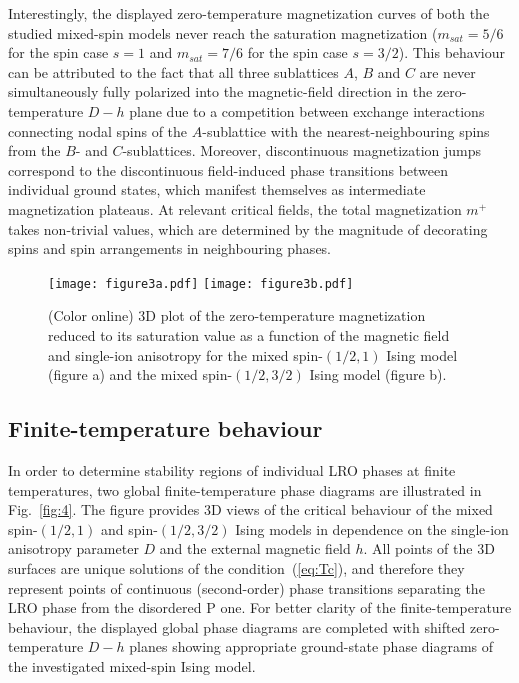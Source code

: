 \documentclass[final,5p,times,sort&compress]{elsarticle}
\begin{document}
Interestingly, the displayed zero-temperature magnetization curves of both the studied mixed-spin models never reach the saturation magnetization ($m_{sat} = 5/6$ for the spin case $s=1$ and $m_{sat} = 7/6$ for the spin case $s=3/2$). This behaviour can be attributed to the fact that all three sublattices $A$, $B$ and $C$ are never simultaneously fully polarized into the magnetic-field direction in the zero-temperature $D-h$ plane due to a competition between exchange interactions connecting nodal spins of the $A$-sublattice with the nearest-neighbouring spins from the $B$- and $C$-sublattices. Moreover, discontinuous magnetization jumps correspond to the discontinuous field-induced phase transitions between individual ground states, which manifest themselves as intermediate magnetization plateaus. At relevant critical fields, the total magnetization $m^+$ takes non-trivial values, which are determined by the magnitude of decorating spins and spin arrangements in neighbouring phases.
\begin{figure*}[t!]
\vspace{0.1cm}
\centering
  \texttt{[image: figure3a.pdf]}
  \hspace{-0.25cm}
  \texttt{[image: figure3b.pdf]}
\vspace{-0.25cm}
\caption{(Color online) 3D plot of the zero-temperature magnetization reduced to its saturation value as a function of the magnetic field and single-ion anisotropy for the mixed spin-$(1/2,1)$ Ising model (figure a) and the mixed spin-$(1/2,3/2)$ Ising model (figure b).
}
\label{fig:3}
\end{figure*}

\subsection{Finite-temperature behaviour}
\label{subsec:33}

In order to determine stability regions of individual LRO phases at finite temperatures, two global finite-temperature \linebreak phase diagrams are illustrated in Fig.~\ref{fig:4}. The figure provides 3D views of the critical behaviour of the mixed spin-$(1/2,1)$ and spin-$(1/2,3/2)$ Ising models in dependence on the single-ion anisotropy parameter $D$ and the external magnetic field $h$. All points of the 3D surfaces are unique solutions of the condition~(\ref{eq:Tc}), and therefore they represent points of continuous (second-order) phase transitions separating the LRO phase from the disordered P one. For better clarity of the finite-temperature behaviour, the displayed global phase diagrams are completed with shifted zero-temperature $D-h$ planes showing appropriate ground-state phase diagrams of the investigated mixed-spin Ising model.
\end{document}
